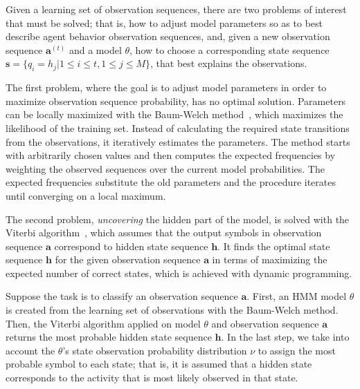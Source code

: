 Given a learning set of observation sequences, there are two problems of interest that must be solved; that is, how to adjust model parameters so as to best describe agent behavior observation sequences, and, given a new observation sequence $\mathbf{a}^{(t)}$ and a model $\theta$, how to choose a corresponding state sequence $\mathbf{s} = \{q_i=h_j | 1 \leq i \leq t, 1 \leq j \leq M\}$, that best explains the observations.


The first problem, where the goal is to adjust model parameters in order to maximize observation sequence probability, has no optimal solution. Parameters can be locally maximized with the Baum-Welch method~\citep{Baum1970}, which maximizes the likelihood of the training set. Instead of calculating the required state transitions from the observations, it iteratively estimates the parameters. The method starts with arbitrarily chosen values and then computes the expected frequencies by weighting the observed sequences over the current model probabilities. The expected frequencies substitute the old parameters and the procedure iterates until converging on a local maximum. 

The second problem, {\it uncovering} the hidden part of the model, is solved with the Viterbi algorithm~\citep{Viterbi1967}, which assumes that the output symbols in observation sequence $\mathbf{a}$ correspond to hidden state sequence $\mathbf{h}$. It finds the optimal state sequence $\mathbf{h}$ for the given observation sequence $\mathbf{a}$ in terms of maximizing the expected number of correct states, which is achieved with dynamic programming.

Suppose the task is to classify an observation sequence $\mathbf{a}$. First, an HMM model $\theta$ is created from the learning set of observations with the Baum-Welch method. Then, the Viterbi algorithm applied on model $\theta$ and observation sequence $\mathbf{a}$ returns the most probable hidden state sequence $\mathbf{h}$. In the last step, we take into account the $\theta$'s state observation probability distribution $\nu$ to assign the most probable symbol to each state; that is, it is assumed that a hidden state corresponds to the activity that is most likely observed in that state.

